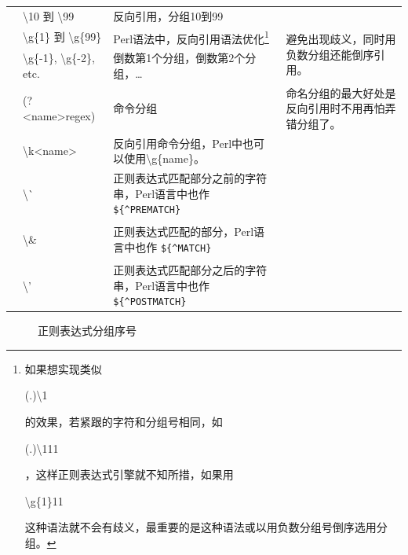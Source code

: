 \documentclass[12pt,a4paper,twoside]{ctexart}
\newcommand{\cbregex}[1]{\colorbox{orange!18}{\strut #1}}
\begin{document}
\begin{center}
\begin{longtable}{p{4em}p{8em}p{25em}p{18em}}
  & \textbackslash{}10 到 \textbackslash{}99 & 反向引用，分组10到99 & \\
  & \textbackslash{}g\{1\} 到 \textbackslash{}g\{99\} & Perl语法中，反向引用语法优化\footnote{如果想实现类似\cbregex{(.)\textbackslash{}1}的效果，若紧跟的字符和分组号相同，如\cbregex{(.)\textbackslash{}111}，这样正则表达式引擎就不知所措，如果用\cbregex{\textbackslash{}g\{1\}11}这种语法就不会有歧义，最重要的是这种语法或以用负数分组号倒序选用分组。} & \multirow{2}{18em}{避免出现歧义，同时用负数分组还能倒序引用。} \\
  & \textbackslash{}g\{-1\}, \textbackslash{}g\{-2\}, etc. & 倒数第1个分组，倒数第2个分组，\ldots & \\
  & (?<name>regex) & 命令分组 & 命名分组的最大好处是反向引用时不用再怕弄错分组了。 \\
  & \textbackslash{}k<name> & 反向引用命令分组，Perl中也可以使用\textbackslash{}g\{name\}。 & \\
  & \cbregex{\textbackslash{}\`{}} & 正则表达式匹配部分之前的字符串，Perl语言中也作 \verb=${^PREMATCH}= & \\
  & \cbregex{\textbackslash{}\&} & 正则表达式匹配的部分，Perl语言中也作 \verb=${^MATCH}= & \\
  & \cbregex{\textbackslash{}'} & 正则表达式匹配部分之后的字符串，Perl语言中也作 \verb=${^POSTMATCH}= & \\
\end{longtable}
\end{center}

\begin{figure}[h]
  \centering

  
  \caption{正则表达式分组序号}
  \label{fig:regex-group-count}
\end{figure}
\end{document}
